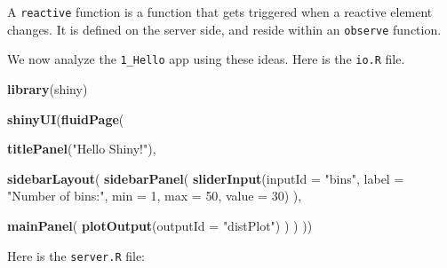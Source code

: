 \documentclass[]{book}
\newenvironment{Shaded}{\begin{snugshade}}{\end{snugshade}}
\newcommand{\KeywordTok}[1]{\textcolor[rgb]{0.13,0.29,0.53}{\textbf{#1}}}
\newcommand{\DataTypeTok}[1]{\textcolor[rgb]{0.13,0.29,0.53}{#1}}
\newcommand{\DecValTok}[1]{\textcolor[rgb]{0.00,0.00,0.81}{#1}}
\newcommand{\StringTok}[1]{\textcolor[rgb]{0.31,0.60,0.02}{#1}}
\newcommand{\CommentTok}[1]{\textcolor[rgb]{0.56,0.35,0.01}{\textit{#1}}}
\newcommand{\ControlFlowTok}[1]{\textcolor[rgb]{0.13,0.29,0.53}{\textbf{#1}}}
\newcommand{\OperatorTok}[1]{\textcolor[rgb]{0.81,0.36,0.00}{\textbf{#1}}}
\newcommand{\NormalTok}[1]{#1}
\theoremstyle{definition}
\theoremstyle{definition}
\theoremstyle{definition}
\theoremstyle{remark}
\begin{document}
A \texttt{reactive} function is a function that gets triggered when a
reactive element changes. It is defined on the server side, and reside
within an \texttt{observe} function.

We now analyze the \texttt{1\_Hello} app using these ideas. Here is the
\texttt{io.R} file.

\begin{Shaded}
\begin{Highlighting}[]
\KeywordTok{library}\NormalTok{(shiny)}

\KeywordTok{shinyUI}\NormalTok{(}\KeywordTok{fluidPage}\NormalTok{(}

  \KeywordTok{titlePanel}\NormalTok{(}\StringTok{"Hello Shiny!"}\NormalTok{),}

  \KeywordTok{sidebarLayout}\NormalTok{(}
    \KeywordTok{sidebarPanel}\NormalTok{(}
      \KeywordTok{sliderInput}\NormalTok{(}\DataTypeTok{inputId =} \StringTok{"bins"}\NormalTok{,}
                  \DataTypeTok{label =} \StringTok{"Number of bins:"}\NormalTok{, }
                  \DataTypeTok{min =} \DecValTok{1}\NormalTok{,}
                  \DataTypeTok{max =} \DecValTok{50}\NormalTok{,}
                  \DataTypeTok{value =} \DecValTok{30}\NormalTok{)}
\NormalTok{    ),}

    \KeywordTok{mainPanel}\NormalTok{(}
      \KeywordTok{plotOutput}\NormalTok{(}\DataTypeTok{outputId =} \StringTok{"distPlot"}\NormalTok{)}
\NormalTok{    )}
\NormalTok{  )}
\NormalTok{))}
\end{Highlighting}
\end{Shaded}

Here is the \texttt{server.R} file:

\begin{Shaded}
\end{Shaded}
\end{document}
